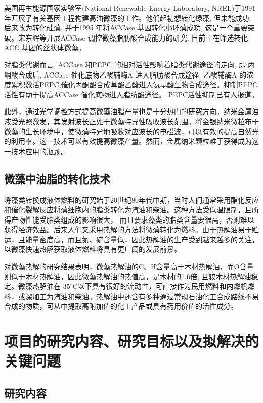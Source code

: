 \documentclass[a4paper,12pt]{report}
\begin{document}
美国再生能源国家实验室(National Renewable Energy Laboratory, NREL)于1991 年开展了有关基因工程构建高油微藻的工作。他们起初想转化绿藻, 但未能成功; 后来改为转化硅藻, 并于1995 年将ACCase 基因转化小环藻成功, 这是一个重要突破。\cite{DunahayTG1995,PG1993}宋东辉等开展ACCase 调控微藻脂肪酸合成能力的研究, 目前正在筛选转化ACC 基因的丝状体微藻。\cite{Song2008}

对脂类代谢而言, ACCase 和PEPC 的相对活性影响着脂类代谢途径的走向, 即:丙酮酸合成后, ACCase 催化底物乙酸辅酶A 进入脂肪酸合成途径; 乙酸辅酶A 的浓度累积激活PEPC,催化丙酮酸合成草酸乙酸进入氨基酸生物合成途径。抑制PEPC 活性有助于提高ACCase 催化底物进入脂肪酸途径。\cite{Song2008} PEPC活性抑制已有人报道。

此外，通过光学调控方式提高微藻油脂产量也是十分热门的研究方向。纳米金属浊液受光照激发，其发射波长正处于微藻特异性吸收波长范围。将金银纳米微粒布于微藻的生长环境中，使微藻特异地吸收对应波长的电磁波，可以有效的提高自然光的利用率。这一技术可以有效提高微藻产量。\cite{Eroglu2013}然而，金属纳米颗粒难于获得成为这一技术应用的瓶颈。

\section{微藻中油脂的转化技术}

将藻类转换成液体燃料的研究始于20世纪80年代中期，当时人们通常采用酯化反应和催化裂解反应将藻细胞内的脂类转化为汽油和柴油。这种方法受低温限制，且所得产物性能受脂类组成的影响很大， 而且要求藻类的脂类含量要很高，否则难以获得经济效益。后来人们又采用热解的方法将微藻转化为燃料。由于热解油易于贮运，且能量密度高，而且氮、硫含量低，因此热解油的生产受到越来越多的关注，以微藻快速热解获取液体燃料将具有更广阔的发展前景。\cite{Miao2003}

对微藻热解的研究结果表明，微藻热解油的C、H含量高于木材热解油，而O含量则低于木材热解油，因此微藻热解油的热值高，是木材的1.6倍, 且较木材热解油稳定。微藻热解油在 $ 35^\circ \mathrm{C}$以下具有很好的流动性，可直接作为民用燃料和内燃机燃料，或深加工为汽油和柴油。热解油中还含有多种通过常规石油化工合成路线不易合成的物质，可从中提取高附加值的化工产品或具有药用价值的活性成分。\cite{Miao2003}

\chapter{项目的研究内容、研究目标以及拟解决的关键问题}
\section{研究内容}
\end{document}
